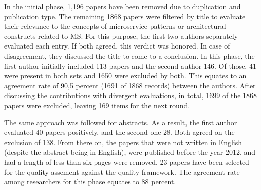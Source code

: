 \documentclass{bmcart}
\begin{document}
In the initial phase, 1,196 papers have been removed due to duplication and publication type. The remaining 1868 papers were filtered by title to evaluate their relevance to the concepts of microservice patterns or architectural constructs related to MS. For this purpose, the first two authors separately evaluated each entry. If both agreed, this verdict was honored. In case of disagreement, they discussed the title to come to a conclusion. In this phase, the first author initially included 113 papers and the second author 146. Of those, 41 were present in both sets and 1650 were excluded by both. This equates to an agreement rate of 90,5 percent (1691 of 1868 records) between the authors. After discussing the contributions with divergent evaluations, in total, 1699 of the 1868 papers were excluded, leaving 169 items for the next round. 

The same approach was followed for abstracts. As a result, the first author evaluated 40 papers positively, and the second one 28. Both agreed on the exclusion of 138. From there on, the papers that were not written in English (despite the abstract being in English), were published before the year 2012, and had a length of less than six pages were removed. 23 papers have been selected for the quality assement against the quality framework. The agreement rate among researchers for this phase equates to 88 percent. 







\end{document}
